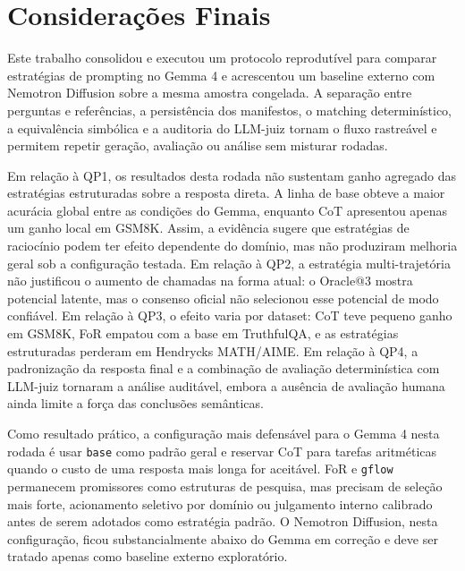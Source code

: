 \documentclass[12pt]{article}
\begin{document}
\section{Considerações Finais}

Este trabalho consolidou e executou um protocolo reprodutível para comparar estratégias de prompting no Gemma 4 e acrescentou um baseline externo com Nemotron Diffusion sobre a mesma amostra congelada. A separação entre perguntas e referências, a persistência dos manifestos, o matching determinístico, a equivalência simbólica e a auditoria do LLM-juiz tornam o fluxo rastreável e permitem repetir geração, avaliação ou análise sem misturar rodadas.

Em relação à QP1, os resultados desta rodada não sustentam ganho agregado das estratégias estruturadas sobre a resposta direta. A linha de base obteve a maior acurácia global entre as condições do Gemma, enquanto CoT apresentou apenas um ganho local em GSM8K. Assim, a evidência sugere que estratégias de raciocínio podem ter efeito dependente do domínio, mas não produziram melhoria geral sob a configuração testada. Em relação à QP2, a estratégia multi-trajetória não justificou o aumento de chamadas na forma atual: o Oracle@3 mostra potencial latente, mas o consenso oficial não selecionou esse potencial de modo confiável. Em relação à QP3, o efeito varia por dataset: CoT teve pequeno ganho em GSM8K, FoR empatou com a base em TruthfulQA, e as estratégias estruturadas perderam em Hendrycks MATH/AIME. Em relação à QP4, a padronização da resposta final e a combinação de avaliação determinística com LLM-juiz tornaram a análise auditável, embora a ausência de avaliação humana ainda limite a força das conclusões semânticas.

Como resultado prático, a configuração mais defensável para o Gemma 4 nesta rodada é usar \texttt{base} como padrão geral e reservar CoT para tarefas aritméticas quando o custo de uma resposta mais longa for aceitável. FoR e \texttt{gflow} permanecem promissores como estruturas de pesquisa, mas precisam de seleção mais forte, acionamento seletivo por domínio ou julgamento interno calibrado antes de serem adotados como estratégia padrão. O Nemotron Diffusion, nesta configuração, ficou substancialmente abaixo do Gemma em correção e deve ser tratado apenas como baseline externo exploratório.
\end{document}
